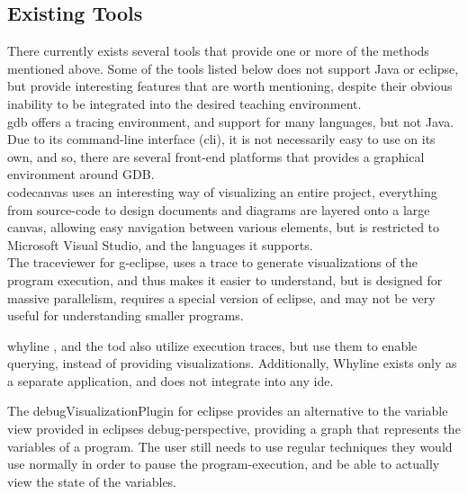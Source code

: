 \subsection{Existing Tools}\label{PreTools}
There currently exists several tools that provide one or more of the methods mentioned above.
Some of the tools listed below does not support Java or eclipse, but provide interesting features that are worth mentioning, despite their obvious inability to be integrated into the desired teaching environment.
~\\

\Gls{gdb} offers a tracing environment, and support for many languages, but not Java.
Due to its command-line interface (\gls{cli}), it is not necessarily easy to use on its own, and so, there are several front-end platforms that provides a graphical environment around GDB.
~\\

\Gls{codecanvas} uses an interesting way of visualizing an entire project, everything from source-code to design documents and diagrams are layered onto a large canvas, allowing easy navigation between various elements, but is restricted to Microsoft Visual Studio, and the languages it supports.
~\\

The \gls{traceviewer} \cite{Kranzlmuller} for g-eclipse, uses a trace to generate visualizations of the program execution, and thus makes it easier to understand, but is designed for massive parallelism, requires a special version of eclipse, and may not be very useful for understanding smaller programs.
~\\

\begin{sloppypar}
\Gls{whyline} \cite{ko2009}, and the \gls{tod} \cite{Pothier2007} also utilize execution traces, but use them to enable querying, instead of providing visualizations.
Additionally, Whyline exists only as a separate application, and does not integrate into any \gls{ide}.
~\\
\end{sloppypar}

The \gls{debugVisualizationPlugin} for eclipse provides an alternative to the variable view provided in eclipses debug-perspective, providing a graph that represents the variables of a program.
The user still needs to use regular techniques they would use normally in order to pause the program-execution, and be able to actually view the state of the variables.
~\\

